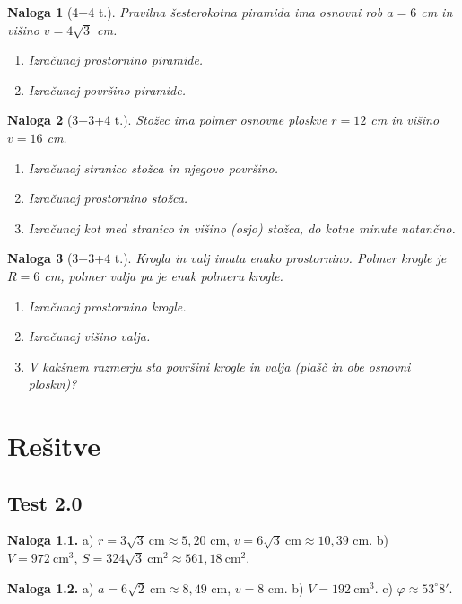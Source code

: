 \documentclass[a4paper,12pt]{article}
\theoremstyle{naloga}
\newtheorem{naloga}{Naloga}[section]
\begin{document}
\begin{naloga}[4+4 t.]
Pravilna šesterokotna piramida ima osnovni rob $a=6$ cm in višino $v=4\sqrt{3}$ cm.
\begin{enumerate}
\item Izračunaj prostornino piramide.
\item Izračunaj površino piramide.
\end{enumerate}
\end{naloga}

\begin{naloga}[3+3+4 t.]
Stožec ima polmer osnovne ploskve $r=12$ cm in višino $v=16$ cm.
\begin{enumerate}
\item Izračunaj stranico stožca in njegovo površino.
\item Izračunaj prostornino stožca.
\item Izračunaj kot med stranico in višino (osjo) stožca, do kotne minute natančno.
\end{enumerate}
\end{naloga}

\begin{naloga}[3+3+4 t.]
Krogla in valj imata enako prostornino. Polmer krogle je $R=6$ cm, polmer valja pa je enak polmeru krogle.
\begin{enumerate}
\item Izračunaj prostornino krogle.
\item Izračunaj višino valja.
\item V kakšnem razmerju sta površini krogle in valja (plašč in obe osnovni ploskvi)?
\end{enumerate}
\end{naloga}

\clearpage
\section*{Rešitve}

\subsection*{Test 2.0}
\textbf{Naloga 1.1.} a) $r=3\sqrt3\ \text{cm}\approx5{,}20$ cm, $v=6\sqrt3\ \text{cm}\approx10{,}39$ cm.\quad
b) $V=972\ \text{cm}^3$, $S=324\sqrt3\ \text{cm}^2\approx561{,}18\ \text{cm}^2$.

\textbf{Naloga 1.2.} a) $a=6\sqrt2\ \text{cm}\approx8{,}49$ cm, $v=8$ cm.\quad
b) $V=192\ \text{cm}^3$.\quad
c) $\varphi\approx53^{\circ}8'$.
\end{document}

